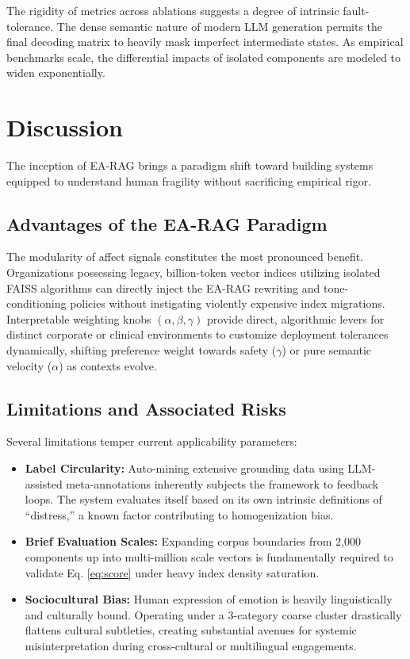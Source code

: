 \documentclass[conference]{IEEEtran}
\begin{document}
The rigidity of metrics across ablations suggests a degree of intrinsic fault-tolerance. The dense semantic nature of modern LLM generation permits the final decoding matrix to heavily mask imperfect intermediate states. As empirical benchmarks scale, the differential impacts of isolated components are modeled to widen exponentially. 

\section{Discussion}

The inception of EA-RAG brings a paradigm shift toward building systems equipped to understand human fragility without sacrificing empirical rigor.

\subsection{Advantages of the EA-RAG Paradigm}
The modularity of affect signals constitutes the most pronounced benefit. Organizations possessing legacy, billion-token vector indices utilizing isolated FAISS algorithms can directly inject the EA-RAG rewriting and tone-conditioning policies without instigating violently expensive index migrations. Interpretable weighting knobs $(\alpha, \beta, \gamma)$ provide direct, algorithmic levers for distinct corporate or clinical environments to customize deployment tolerances dynamically, shifting preference weight towards safety ($\gamma$) or pure semantic velocity ($\alpha$) as contexts evolve.

\subsection{Limitations and Associated Risks}
Several limitations temper current applicability parameters:
\begin{itemize}
    \item \textbf{Label Circularity:} Auto-mining extensive grounding data using LLM-assisted meta-annotations inherently subjects the framework to feedback loops. The system evaluates itself based on its own intrinsic definitions of ``distress,'' a known factor contributing to homogenization bias.
    \item \textbf{Brief Evaluation Scales:} Expanding corpus boundaries from 2,000 components up into multi-million scale vectors is fundamentally required to validate Eq. \ref{eq:score} under heavy index density saturation.
    \item \textbf{Sociocultural Bias:} Human expression of emotion is heavily linguistically and culturally bound. Operating under a 3-category coarse cluster drastically flattens cultural subtleties, creating substantial avenues for systemic misinterpretation during cross-cultural or multilingual engagements.
\end{itemize}
\end{document}
